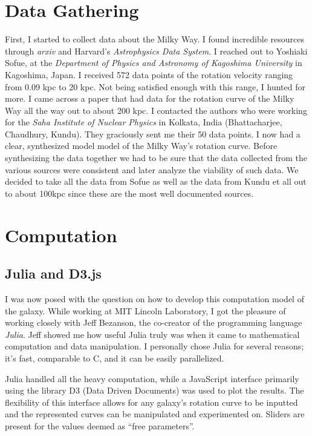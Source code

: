 \documentclass[titlepage]{article}
\begin{document}
\section{Data Gathering}
First, I started to collect data about the Milky Way. I found incredible resources through \textit{arxiv} and Harvard's \textit{Astrophysics Data System}. I reached out to Yoshiaki Sofue, at the \textit{Department of Physics and Astronomy of Kagoshima University} in Kagoshima, Japan. I received 572 data points of the rotation velocity ranging from 0.09 kpc to 20 kpc. Not being satisfied enough with this range, I hunted for more. I came across a paper that had data for the rotation curve of the Milky Way all the way out to about 200 kpc. I contacted the authors who were working for the \textit{Saha Institute of Nuclear Physics} in Kolkata, India (Bhattacharjee, Chaudhury, Kundu). They graciously sent me their 50 data points. I now had a clear, synthesized model model of the Milky Way's rotation curve.  Before synthesizing the data together we had to be sure that the data collected from the various sources were consistent and later analyze the viability of such data.  We decided to take all the data from Sofue as well as the data from Kundu et all out to about 100kpc since these are the most well documented sources.

\section{Computation}

\subsection{Julia and D3.js}
I was now posed with the question on how to develop this computation model of the galaxy. While working at MIT Lincoln Laboratory, I got the pleasure of working closely with Jeff Bezanson, the co-creator of the programming language \textit{Julia}. Jeff showed me how useful Julia truly was when it came to mathematical computation and data manipulation. I personally chose Julia for several reasons; it's fast, comparable to C, and it can be easily parallelized.

Julia handled all the heavy computation, while a JavaScript interface primarily using the library D3 (Data Driven Documents) was used to plot the results. The flexibility of this interface allows for any galaxy's rotation curve to be inputted and the represented curves can be manipulated and experimented on. Sliders are present for the values deemed as ``free parameters''.
\end{document}
